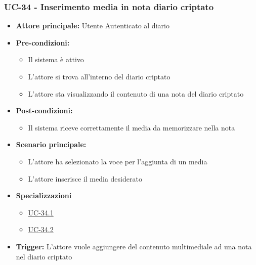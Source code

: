 \documentclass[a4paper,12pt]{article}
\begin{document}
\subsubsection{UC-34 - Inserimento media in nota diario criptato} \label{subsec:UC-34}
\begin{itemize}
    \item \textbf{Attore principale:} Utente Autenticato al diario
    \item \textbf{Pre-condizioni:}
    \begin{itemize}
        \item Il sistema è attivo
        \item L'attore si trova all'interno del diario criptato
        \item L'attore sta visualizzando il contenuto di una nota del diario criptato
    \end{itemize}
    \item \textbf{Post-condizioni:}
    \begin{itemize}
        \item Il sistema riceve correttamente il media da memorizzare nella nota
    \end{itemize}
    \item \textbf{Scenario principale:}
    \begin{itemize}
        \item L'attore ha selezionato la voce per l'aggiunta di un media
        \item L'attore inserisce il media desiderato
    \end{itemize}
    \item \textbf{Specializzazioni}
    \begin{itemize}
        \item \hyperref[subsec:UC-34.1]{UC-34.1}
        \item \hyperref[subsec:UC-34.2]{UC-34.2}
    \end{itemize}
    \item \textbf{Trigger:} L'attore vuole aggiungere del contenuto multimediale ad una nota nel diario criptato
\end{itemize}
\end{document}
